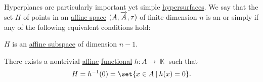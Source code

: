 \begin{definition}\label{def:affine_hyperplane}
  Hyperplanes are particularly important yet simple \hyperref[con:geometric_shape]{hypersurfaces}. We say that the set \( H \) of points in an \hyperref[def:affine_space]{affine space} \( (A, \overrightarrow{A}, \tau) \) of finite dimension \( n \) is an  or simply  if any of the following equivalent conditions hold:

  \begin{thmenum}
     \( H \) is an \hyperref[def:affine_subspace]{affine subspace} of dimension \( n - 1 \).

     There exists a nontrivial \hyperref[def:affine_operator]{affine} \hyperref[con:functional]{functional} \( h: A \to \BbbK \) such that
    \begin{equation*}
      H = h^{-1}(0) = \set{ x \in A \given h(x) = 0 }.
    \end{equation*}
  \end{thmenum}
\end{definition}

